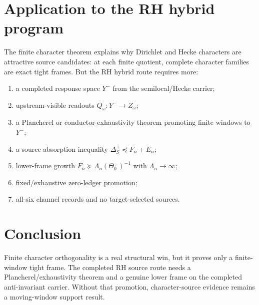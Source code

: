 \documentclass[11pt]{article}
\begin{document}
\section{Application to the RH hybrid program}
The finite character theorem explains why Dirichlet and Hecke characters are attractive source candidates: at each finite quotient, complete character families are exact tight frames.  But the RH hybrid route requires more:
\begin{enumerate}[label=(\roman*)]
  \item a completed response space $Y^-$ from the semilocal/Hecke carrier;
  \item upstream-visible readouts $Q_\omega:Y^-\to Z_\omega$;
  \item a Plancherel or conductor-exhaustivity theorem promoting finite windows to $Y^-$;
  \item a source absorption inequality $\Delta_S^+\preceq F_n+E_n$;
  \item lower-frame growth $F_n\succeq\Lambda_n(\Theta_0^-)^{-1}$ with $\Lambda_n\to\infty$;
  \item fixed/exhaustive zero-ledger promotion;
  \item all-six channel records and no target-selected sources.
\end{enumerate}

\section{Conclusion}
Finite character orthogonality is a real structural win, but it proves only a finite-window tight frame.  The completed RH source route needs a Plancherel/exhaustivity theorem and a genuine lower frame on the completed anti-invariant carrier.  Without that promotion, character-source evidence remains a moving-window support result.
\end{document}

